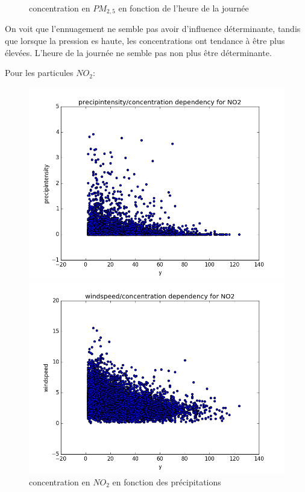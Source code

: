 \begin{figure}[H]
  \caption{concentration en $PM_{2,5}$ en fonction de l'heure de la journée}
	\endminipage\hfill
\end{figure}
On voit que l'ennuagement ne semble pas avoir d'influence déterminante, tandis que lorsque la pression es haute, les concentrations ont tendance à être plus élevées.
L'heure de la journée ne semble pas non plus être déterminante.

Pour les particules $NO_2$:
\begin{figure}[H]
	\captionsetup{labelformat=empty}
	\includegraphics[width=\linewidth]{images/NO2_precip_y.png}
  \caption{concentration en $NO_2$ en fonction des précipitations}
	\endminipage\hfill
	\includegraphics[width=\linewidth]{images/NO2_windspeed_y.png}

\end{figure}
